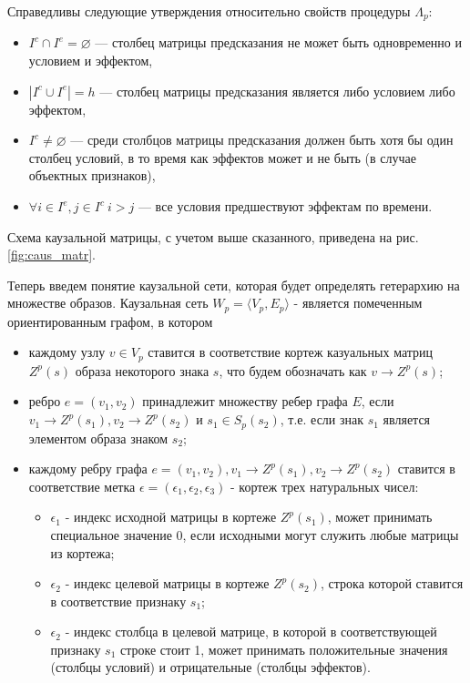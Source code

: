 \documentclass[12pt]{report}
\begin{document}
	Справедливы следующие утверждения относительно свойств процедуры $\Lambda_p$:
	\begin{itemize}
		\item $I^c\cap I^e=\varnothing$ --- столбец матрицы предсказания не может быть одновременно и условием и эффектом,
		\item $|I^c\cup I^e|=h$ --- столбец матрицы предсказания является либо условием либо эффектом,
		\item $I^c\not = \varnothing$ --- среди столбцов матрицы предсказания должен быть хотя бы один столбец условий, в то время как эффектов может и не быть (в случае объектных признаков),
		\item $\forall i\in I^e, j\in I^c\ i>j$ --- все условия предшествуют эффектам по времени.
	\end{itemize}
	
	Схема каузальной матрицы, с учетом выше сказанного, приведена на рис. \ref{fig:caus_matr}.
	
	Теперь введем понятие каузальной сети, которая будет определять гетерархию на множестве образов. Каузальная сеть $W_p=\langle V_p, E_p \rangle$ - является помеченным ориентированным графом, в котором
	\begin{itemize}
		\item каждому узлу $v\in V_p$ ставится в соответствие кортеж казуальных матриц $Z^p(s)$ образа некоторого знака $s$, что будем обозначать как $v\rightarrow Z^p(s)$;
		\item ребро $e=(v_1, v_2)$ принадлежит множеству ребер графа $E$, если $v_1\rightarrow Z^p(s_1), v_2\rightarrow Z^p(s_2)$ и $s_1\in S_p(s_2)$, т.е. если знак $s_1$ является элементом образа знаком $s_2$;
		\item каждому ребру графа $e=(v_1, v_2), v_1\rightarrow Z^p(s_1), v_2\rightarrow Z^p(s_2)$ ставится в соответствие метка $\epsilon=(\epsilon_1,\epsilon_2,\epsilon_3)$ - кортеж трех натуральных чисел:
		\begin{itemize}
			\item $\epsilon_1$ - индекс исходной матрицы в кортеже $Z^p(s_1)$, может принимать специальное значение 0, если исходными могут служить любые матрицы из кортежа;
			\item $\epsilon_2$ - индекс целевой матрицы в кортеже $Z^p(s_2)$, строка которой ставится в соответствие признаку $s_1$;
			\item $\epsilon_2$ - индекс столбца в целевой матрице, в которой в соответствующей признаку $s_1$ строке стоит 1, может принимать положительные значения (столбцы условий) и отрицательные (столбцы эффектов).
		\end{itemize}		
	\end{itemize}
	
\end{document}
